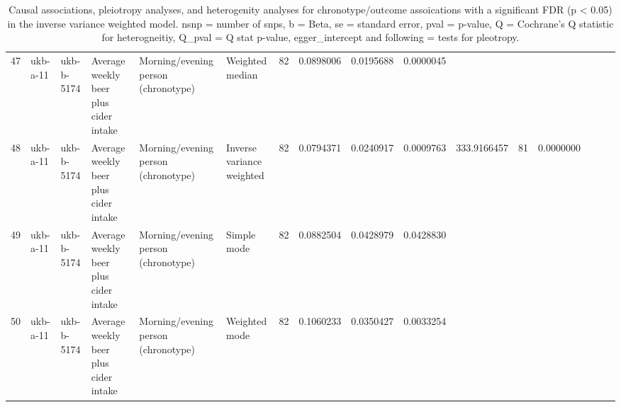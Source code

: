 \begin{table}[ht]
\begin{tabular}{llllllrrrrrrrrrr}
  47 & ukb-a-11 & ukb-b-5174 & Average weekly beer plus cider intake & Morning/evening person (chronotype) & Weighted median & 82 & 0.0898006 & 0.0195688 & 0.0000045 &  &  &  &  &  &  \\ 
  48 & ukb-a-11 & ukb-b-5174 & Average weekly beer plus cider intake & Morning/evening person (chronotype) & Inverse variance weighted & 82 & 0.0794371 & 0.0240917 & 0.0009763 & 333.9166457 & 81 & 0.0000000 &  &  &  \\ 
  49 & ukb-a-11 & ukb-b-5174 & Average weekly beer plus cider intake & Morning/evening person (chronotype) & Simple mode & 82 & 0.0882504 & 0.0428979 & 0.0428830 &  &  &  &  &  &  \\ 
  50 & ukb-a-11 & ukb-b-5174 & Average weekly beer plus cider intake & Morning/evening person (chronotype) & Weighted mode & 82 & 0.1060233 & 0.0350427 & 0.0033254 &  &  &  &  &  &  \\ 
   \hline
\end{tabular}
\caption{Causal associations, pleiotropy analyses, and heterogenity analyses for chronotype/outcome assoications with a significant FDR (p < 0.05) in the inverse variance weighted model. nsnp = number of snps, b = Beta,  se = standard error, pval = p-value, Q = Cochrane's Q statistic for heterogneitiy, Q_pval = Q stat p-value, egger_intercept and following = tests for pleotropy.} 
\label{FDR_Signif_CHR_Exposure}
\end{table}
